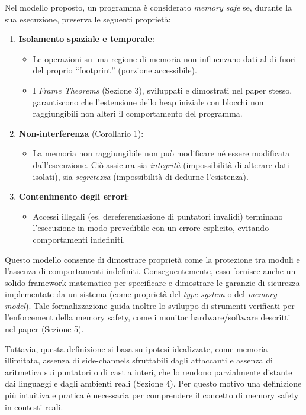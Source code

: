 Nel modello proposto, un programma è considerato \textit{memory safe} se, durante
la sua esecuzione, preserva le seguenti proprietà:
\begin{enumerate}
  \item \textbf{Isolamento spaziale e temporale}:
    \begin{itemize}
      \item Le operazioni su una regione di memoria non influenzano dati al di fuori
        del proprio ``footprint'' (porzione accessibile).

      \item I \textit{Frame Theorems} (Sezione 3), sviluppati e dimostrati nel paper
        stesso, garantiscono che l'estensione dello heap iniziale con blocchi
        non raggiungibili non alteri il comportamento del programma.
    \end{itemize}

  \item \textbf{Non-interferenza} (Corollario 1):
    \begin{itemize}
      \item La memoria non raggiungibile non può modificare né essere modificata
        dall'esecuzione. Ciò assicura sia \textit{integrità} (impossibilità di
        alterare dati isolati), sia \textit{segretezza} (impossibilità di
        dedurne l'esistenza).
    \end{itemize}

  \item \textbf{Contenimento degli errori}:
    \begin{itemize}
      \item Accessi illegali (es. dereferenziazione di puntatori invalidi)
        terminano l'esecuzione in modo prevedibile con un errore esplicito, evitando
        comportamenti indefiniti.
    \end{itemize}
\end{enumerate}

Questo modello consente di dimostrare proprietà come la protezione tra moduli e
l'assenza di comportamenti indefiniti. Conseguentemente, esso fornisce anche un
solido framework matematico per specificare e dimostrare le garanzie di
sicurezza implementate da un sistema (come proprietà del \textit{type system} o
del \textit{memory model}). Tale formalizzazione guida inoltre lo sviluppo di strumenti
verificati per l'enforcement della memory safety, come i monitor hardware/software
descritti nel paper (Sezione 5).

Tuttavia, questa definizione si basa su ipotesi idealizzate, come memoria
illimitata, assenza di side-channels sfruttabili dagli attaccanti e assenza di aritmetica
sui puntatori o di cast a interi, che lo rendono parzialmente distante dai
linguaggi e dagli ambienti reali (Sezione 4). Per questo motivo una definizione più
intuitiva e pratica è necessaria per comprendere il concetto di memory safety in
contesti reali.

